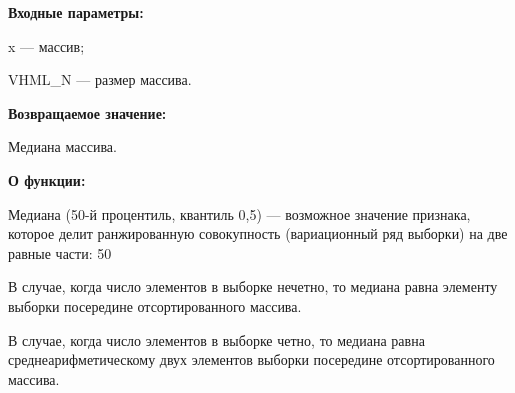\textbf{Входные параметры:}

 x --- массив;
 
 VHML\_N --- размер массива.

\textbf{Возвращаемое значение:}

 Медиана массива.
 
\textbf{ О функции:}

Медиана (50-й процентиль, квантиль 0,5) — возможное значение признака, которое делит ранжированную совокупность (вариационный ряд выборки) на две равные части: 50 %

В случае, когда число элементов в выборке нечетно, то медиана равна элементу выборки посередине отсортированного массива.

В случае, когда число элементов в выборке четно, то медиана равна среднеарифметическому двух элементов выборки посередине отсортированного массива.
